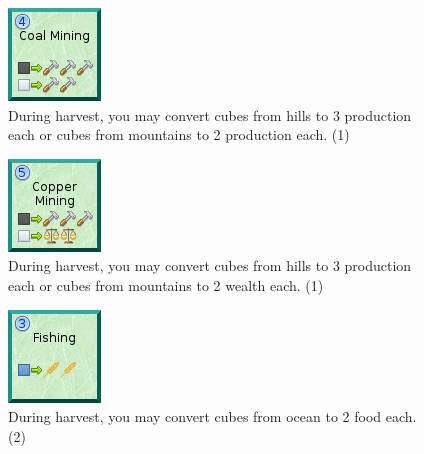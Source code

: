 \documentclass[11pt,a4paper,titlepage]{article}
\begin{document}
{{  \begin{figure}[!htb]
    \begin{minipage}[c]{0.1\textwidth}
      \includegraphics[scale=.7]{doe_tech_coal_mining.png}
    \end{minipage}\hfill
    \begin{minipage}[c]{0.6\textwidth}
      \captionsetup{labelformat=empty, justification=justified, singlelinecheck=false}
      \caption{During harvest, you may convert cubes from hills to 3 production each or cubes from mountains to 2 production each. (1)}
    \end{minipage}\hfill
    \label{fig:tech_coal_mining}
  \end{figure}

  \begin{figure}[!htb]
    \begin{minipage}[c]{0.1\textwidth}
      \includegraphics[scale=.7]{doe_tech_copper_mining.png}
    \end{minipage}\hfill
    \begin{minipage}[c]{0.6\textwidth}
      \captionsetup{labelformat=empty, justification=justified, singlelinecheck=false}
      \caption{During harvest, you may convert cubes from hills to 3 production each or cubes from mountains to 2 wealth each. (1)}
    \end{minipage}\hfill
    \label{fig:tech_copper_mining}
  \end{figure}

  \begin{figure}[!htb]
    \begin{minipage}[c]{0.1\textwidth}
      \includegraphics[scale=.7]{doe_tech_fishing.png}
    \end{minipage}\hfill
    \begin{minipage}[c]{0.6\textwidth}
      \captionsetup{labelformat=empty, justification=justified, singlelinecheck=false}
      \caption{During harvest, you may convert cubes from ocean to 2 food each. (2)}
    \end{minipage}\hfill
    \label{fig:tech_fishing}
  \end{figure}

}}
\end{document}
